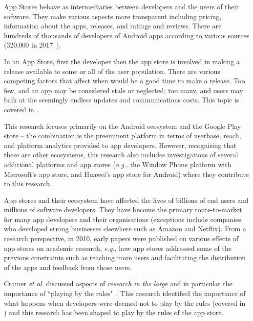 App Stores behave as intermediaries between developers and the users of their software. They make various aspects more transparent including pricing, information about the apps, releases, and ratings and reviews. There are hundreds of thousands of developers of Android apps according to various sources (320,000 in 2017~). %

In an App Store, first the developer then the app store is involved in making a release available to some or all of the user population. There are various competing factors that affect when would be a good time to make a release. Too few, and an app may be considered stale or neglected; too many, and users may balk at the seemingly endless updates and communications costs. This topic is covered in .  

This research focuses primarily on the Android ecosystem and the Google Play store -- the combination is the preeminent platform in terms of userbase, reach, and platform analytics provided to app developers. However, recognising that these are other ecosystems, this research also includes investigations of several additional platforms and app stores (\emph{e.g.}, the Window Phone platform with Microsoft's app store, and Huawei's app store for Android) where they contribute to this research. 

App stores and their ecosystem have affected the lives of billions of end users and millions of software developers. They have become the primary route-to-market for many app developers and their organisations (exceptions include companies who developed strong businesses elsewhere such as Amazon and Netflix). 
From a research perspective, in 2010, early papers were published on various effects of app stores on academic research, \emph{e.g.}, how app stores addressed some of the previous constraints such as reaching more users and facilitating the distribution of the apps and feedback from those users. 

Cramer \emph{et al.} discussed aspects of \emph{research in the large} and in particular the importance of ``playing by the rules"~. This research identified the importance of what happens when developers were deemed not to play by the rules (covered in ) and this research has been shaped to play by the rules of the app store. %

